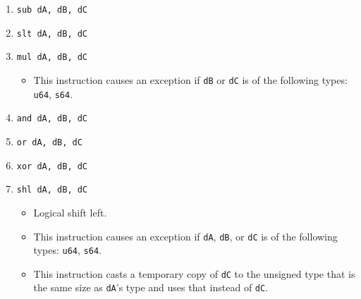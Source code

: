 \documentclass{article}
\begin{document}
\begin{itemize}
\begin{enumerate}
			\item \texttt{sub dA, dB, dC}
			\item \texttt{slt dA, dB, dC}
			\item \texttt{mul dA, dB, dC}
				\begin{itemize}
				\item This instruction causes an exception if \texttt{dB}
					or \texttt{dC} is of the following types: \texttt{u64},
					\texttt{s64}.
				\end{itemize}

			\item \texttt{and dA, dB, dC}
			\item \texttt{or dA, dB, dC}
			\item \texttt{xor dA, dB, dC}
			\item \texttt{shl dA, dB, dC}
				\begin{itemize}
				\item Logical shift left.
				\item This instruction causes an exception if \texttt{dA},
					\texttt{dB}, or \texttt{dC} is of the following types:
					\texttt{u64}, \texttt{s64}.
				\item This instruction casts a temporary copy of
					\texttt{dC} to the unsigned type that is the same size
					as \texttt{dA}'s type and uses that instead of
					\texttt{dC}.
				\end{itemize}


\end{enumerate}
\end{itemize}
\end{document}
